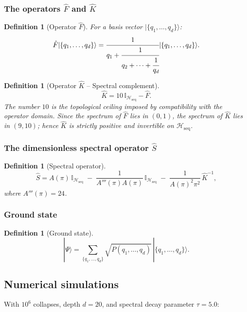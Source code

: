 \documentclass[12pt]{article}
\numberwithin{equation}{section}
\newtheorem{definition}[theorem]{Definition}
\begin{document}
\subsubsection{The operators \(\hat F\) and \(\hat K\)}

\begin{definition}[Operator \(\hat F\)]\label{def:F}
For a basis vector \(|\{q_1,\dots,q_d\}\rangle\):
\[
\hat F |\{q_1,\dots,q_d\}\rangle = \cfrac{1}{q_1 + \cfrac{1}{q_2 + \dots + \cfrac{1}{q_d}}} |\{q_1,\dots,q_d\}\rangle.
\]
\end{definition}

\begin{definition}[Operator \(\hat K\) – Spectral complement]\label{def:K}
\[
\hat K = 10\,\mathbb{I}_{\mathcal{H}_{\text{seq}}} - \hat F.
\]
The number \(10\) is the topological ceiling imposed by compatibility with the operator domain. Since the spectrum of \(\hat F\) lies in \((0,1)\), the spectrum of \(\hat K\) lies in \((9,10)\); hence \(\hat K\) is strictly positive and invertible on \(\mathcal{H}_{\text{seq}}\).
\end{definition}

\subsubsection{The dimensionless spectral operator \(\hat S\)}

\begin{definition}[Spectral operator]\label{def:S}
\[
\hat S = A(\pi)\,\mathbb{I}_{\mathcal{H}_{\text{seq}}} \;-\; \frac{1}{A'''(\pi)A(\pi)}\,\mathbb{I}_{\mathcal{H}_{\text{seq}}} \;-\; \frac{1}{A(\pi)^2 \pi^2}\,\hat K^{-1},
\]
where \(A'''(\pi)=24\).
\end{definition}

\subsubsection{Ground state}

\begin{definition}[Ground state]\label{def:ground}
\[
|\Psi\rangle = \sum_{\{q_1,\dots,q_d\}} \sqrt{P(q_1,\dots,q_d)}\, |\{q_1,\dots,q_d\}\rangle.
\]
\end{definition}

\subsection{Numerical simulations}

With \(10^6\) collapses, depth \(d=20\), and spectral decay parameter \(\tau = 5.0\):
\end{document}
